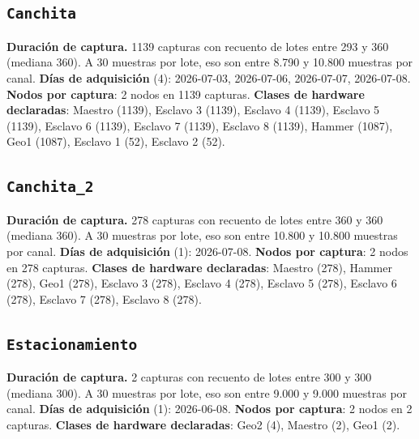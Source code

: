 \subsection{\texttt{Canchita}}
\textbf{Duraci\'on de captura.} 1139 capturas con recuento de lotes entre 293 y 360 (mediana 360). A 30 muestras por lote, eso son entre 8.790 y 10.800 muestras por canal.
\textbf{D\'ias de adquisici\'on} (4): 2026-07-03, 2026-07-06, 2026-07-07, 2026-07-08.
\textbf{Nodos por captura}: 2 nodos en 1139 capturas.
\textbf{Clases de hardware declaradas}: Maestro (1139), Esclavo 3 (1139), Esclavo 4 (1139), Esclavo 5 (1139), Esclavo 6 (1139), Esclavo 7 (1139), Esclavo 8 (1139), Hammer (1087), Geo1 (1087), Esclavo 1 (52), Esclavo 2 (52).

\subsection{\texttt{Canchita\_2}}
\textbf{Duraci\'on de captura.} 278 capturas con recuento de lotes entre 360 y 360 (mediana 360). A 30 muestras por lote, eso son entre 10.800 y 10.800 muestras por canal.
\textbf{D\'ias de adquisici\'on} (1): 2026-07-08.
\textbf{Nodos por captura}: 2 nodos en 278 capturas.
\textbf{Clases de hardware declaradas}: Maestro (278), Hammer (278), Geo1 (278), Esclavo 3 (278), Esclavo 4 (278), Esclavo 5 (278), Esclavo 6 (278), Esclavo 7 (278), Esclavo 8 (278).

\subsection{\texttt{Estacionamiento}}
\textbf{Duraci\'on de captura.} 2 capturas con recuento de lotes entre 300 y 300 (mediana 300). A 30 muestras por lote, eso son entre 9.000 y 9.000 muestras por canal.
\textbf{D\'ias de adquisici\'on} (1): 2026-06-08.
\textbf{Nodos por captura}: 2 nodos en 2 capturas.
\textbf{Clases de hardware declaradas}: Geo2 (4), Maestro (2), Geo1 (2).

